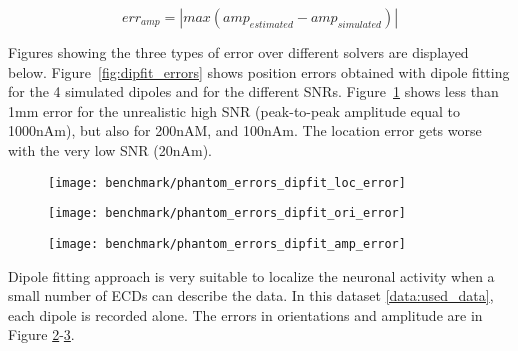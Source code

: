 \begin{equation}\label{eq:amp_err}
err_{amp} = |max(amp_{estimated} - amp_{simulated})|
\end{equation}

Figures showing the three types of error over different solvers are displayed below. Figure~\ref{fig:dipfit_errors} shows position errors obtained with dipole fitting for the 4 simulated dipoles and for the different SNRs. Figure~\ref{fig:dipfit_pos} shows less than 1mm error for the unrealistic high SNR (peak-to-peak amplitude equal to 1000nAm), but also for 200nAM, and 100nAm. The location error gets worse with the very low SNR (20nAm).

\begin{sidewaysfigure}[ht]
        \centering
        \begin{subfigure}[b]{0.28\textwidth}
            \centering
            \texttt{[image: benchmark/phantom\_errors\_dipfit\_loc\_error]}
            \caption{\label{fig:dipfit_pos}}
        \end{subfigure}
		\hspace{35pt}
        \begin{subfigure}[b]{0.28\textwidth}  
            \centering 
            \texttt{[image: benchmark/phantom\_errors\_dipfit\_ori\_error]}
            \caption{\label{fig:dipfit_ori}}
        \end{subfigure}
		\hspace{35pt}
        \begin{subfigure}[b]{0.28\textwidth}   
            \centering 
            \texttt{[image: benchmark/phantom\_errors\_dipfit\_amp\_error]}
            \caption{\label{fig:dipfit_amp}}
        \end{subfigure}

		\caption{The dipole fit errors on localization (mm), orientation (Rad), and amplitude (nAm) using 4 dipoles (5-8) having different depth in the phantom.\label{fig:dipfit_errors}}
\end{sidewaysfigure}

Dipole fitting approach is very suitable to localize the neuronal activity when a small number of \ac{ECD}s can describe the data. In this dataset \ref{data:used_data}, each dipole is recorded alone. The errors in orientations and amplitude are in Figure \ref{fig:dipfit_ori}-\ref{fig:dipfit_amp}.

